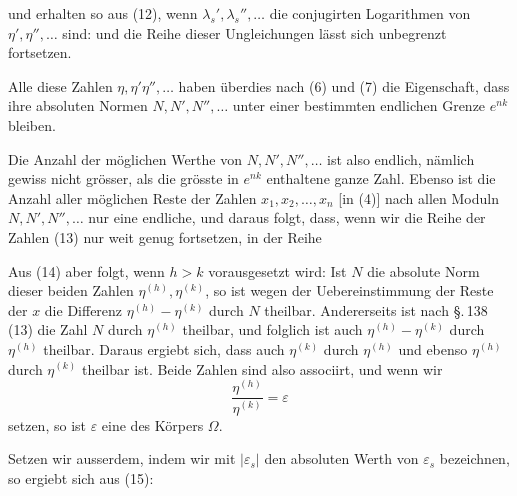 und erhalten so aus (12), wenn $\lambda_s', \lambda_s'', \dots$ die conjugirten Logarithmen von $\eta', \eta'', \dots$ sind:
und die Reihe dieser Ungleichungen l\"asst sich unbegrenzt fortsetzen.

Alle diese Zahlen $\eta, \eta' \eta'', \dots$ haben \"uberdies nach (6) und (7) die Eigenschaft, dass ihre absoluten Normen $N, N', N'', \dots$ unter einer bestimmten endlichen Grenze $e^{nk}$ bleiben.


Die Anzahl der m\"oglichen Werthe von $N, N', N'', \dots$ ist also endlich, n\"amlich gewiss nicht gr\"osser, als die gr\"osste in $e^{nk}$ enthaltene ganze Zahl. Ebenso ist die Anzahl aller m\"oglichen Reste der Zahlen $x_1, x_2, \dots, x_n$ [in (4)] nach allen Moduln $N, N', N'', \dots$ nur eine endliche, und daraus folgt, dass, wenn wir die Reihe der Zahlen (13) nur weit genug fortsetzen, in der Reihe 

Aus (14) aber folgt, wenn $h > k$ vorausgesetzt wird:
Ist $N$ die absolute Norm dieser beiden Zahlen $\eta^{(h)}, \eta^{(k)}$, so ist wegen der Uebereinstimmung der Reste der $x$ die Differenz $\eta^{(h)} - \eta^{(k)}$ durch $N$ theilbar. Andererseits ist nach \S.\,138\,(13) die Zahl $N$ durch $\eta^{(h)}$ theilbar, und folglich ist auch $\eta^{(h)} - \eta^{(k)}$ durch $\eta^{(h)}$ theilbar. Daraus ergiebt sich, dass auch $\eta^{(k)}$ durch $\eta^{(h)}$ und ebenso $\eta^{(h)}$ durch $\eta^{(k)}$ theilbar ist. Beide Zahlen sind also associirt, und wenn wir
\[
\frac{\eta^{(h)}}{\eta^{(k)}} = \varepsilon
\]
setzen, so ist $\varepsilon$ eine  des K\"orpers $\Omega$.

Setzen wir ausserdem, indem wir mit $|\varepsilon_s|$ den absoluten Werth von $\varepsilon_s$ bezeichnen,
so ergiebt sich aus (15):

